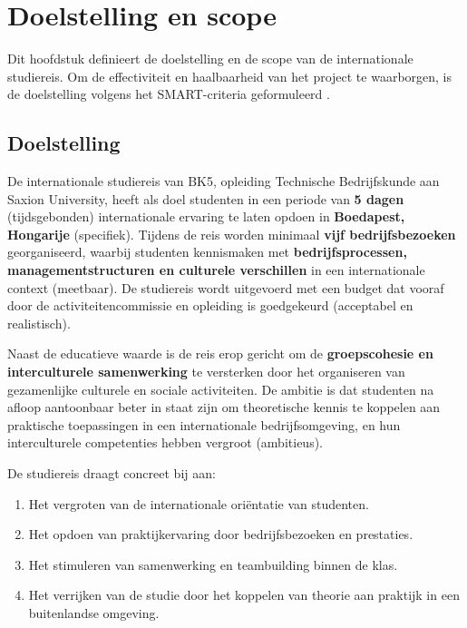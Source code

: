 \section{Doelstelling en scope}

Dit hoofdstuk definieert de doelstelling en de scope van de internationale studiereis. Om de effectiviteit en haalbaarheid van het project te waarborgen, is de doelstelling volgens het SMART-criteria geformuleerd \cite{doran1981smart}.

\subsection{Doelstelling}

De internationale studiereis van BK5, opleiding Technische Bedrijfskunde aan Saxion University, heeft als doel studenten in een periode van \textbf{5 dagen} (tijdsgebonden)
internationale ervaring te laten opdoen in \textbf{Boedapest, Hongarije} (specifiek). Tijdens de reis worden minimaal \textbf{vijf bedrijfsbezoeken} georganiseerd, waarbij
studenten kennismaken met \textbf{bedrijfsprocessen, managementstructuren en culturele verschillen} in een internationale context (meetbaar). De studiereis wordt uitgevoerd
met een budget dat vooraf door de activiteitencommissie en opleiding is goedgekeurd (acceptabel en realistisch).  

\vspace{1cm}

Naast de educatieve waarde is de reis erop gericht om de \textbf{groepscohesie en interculturele samenwerking} te versterken door het organiseren
van gezamenlijke culturele en sociale activiteiten. De ambitie is dat studenten na afloop aantoonbaar beter in staat zijn om theoretische kennis
te koppelen aan praktische toepassingen in een internationale bedrijfsomgeving, en hun interculturele competenties hebben vergroot (ambitieus).

De studiereis draagt concreet bij aan:

\begin{enumerate}
	\item Het vergroten van de internationale oriëntatie van studenten.
	\item Het opdoen van praktijkervaring door bedrijfsbezoeken en prestaties.
	\item Het stimuleren van samenwerking en teambuilding binnen de klas.
	\item Het verrijken van de studie door het koppelen van theorie aan praktijk in een buitenlandse omgeving.
\end{enumerate}

